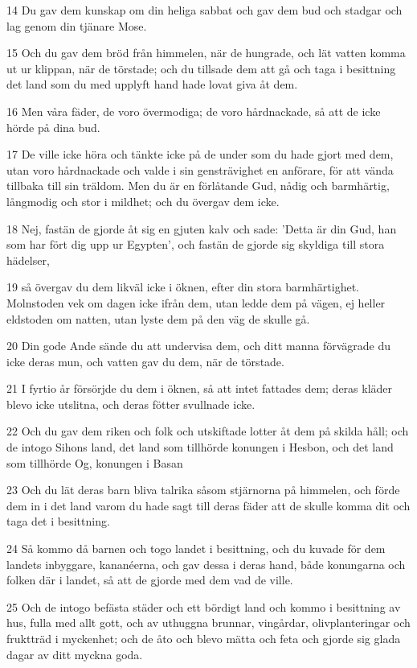 \par 14 Du gav dem kunskap om din heliga sabbat och gav dem bud och stadgar och lag genom din tjänare Mose.
\par 15 Och du gav dem bröd från himmelen, när de hungrade, och lät vatten komma ut ur klippan, när de törstade; och du tillsade dem att gå och taga i besittning det land som du med upplyft hand hade lovat giva åt dem.
\par 16 Men våra fäder, de voro övermodiga; de voro hårdnackade, så att de icke hörde på dina bud.
\par 17 De ville icke höra och tänkte icke på de under som du hade gjort med dem, utan voro hårdnackade och valde i sin gensträvighet en anförare, för att vända tillbaka till sin träldom. Men du är en förlåtande Gud, nådig och barmhärtig, långmodig och stor i mildhet; och du övergav dem icke.
\par 18 Nej, fastän de gjorde åt sig en gjuten kalv och sade: 'Detta är din Gud, han som har fört dig upp ur Egypten', och fastän de gjorde sig skyldiga till stora hädelser,
\par 19 så övergav du dem likväl icke i öknen, efter din stora barmhärtighet. Molnstoden vek om dagen icke ifrån dem, utan ledde dem på vägen, ej heller eldstoden om natten, utan lyste dem på den väg de skulle gå.
\par 20 Din gode Ande sände du att undervisa dem, och ditt manna förvägrade du icke deras mun, och vatten gav du dem, när de törstade.
\par 21 I fyrtio år försörjde du dem i öknen, så att intet fattades dem; deras kläder blevo icke utslitna, och deras fötter svullnade icke.
\par 22 Och du gav dem riken och folk och utskiftade lotter åt dem på skilda håll; och de intogo Sihons land, det land som tillhörde konungen i Hesbon, och det land som tillhörde Og, konungen i Basan
\par 23 Och du lät deras barn bliva talrika såsom stjärnorna på himmelen, och förde dem in i det land varom du hade sagt till deras fäder att de skulle komma dit och taga det i besittning.
\par 24 Så kommo då barnen och togo landet i besittning, och du kuvade för dem landets inbyggare, kananéerna, och gav dessa i deras hand, både konungarna och folken där i landet, så att de gjorde med dem vad de ville.
\par 25 Och de intogo befästa städer och ett bördigt land och kommo i besittning av hus, fulla med allt gott, och av uthuggna brunnar, vingårdar, olivplanteringar och fruktträd i myckenhet; och de åto och blevo mätta och feta och gjorde sig glada dagar av ditt myckna goda.
